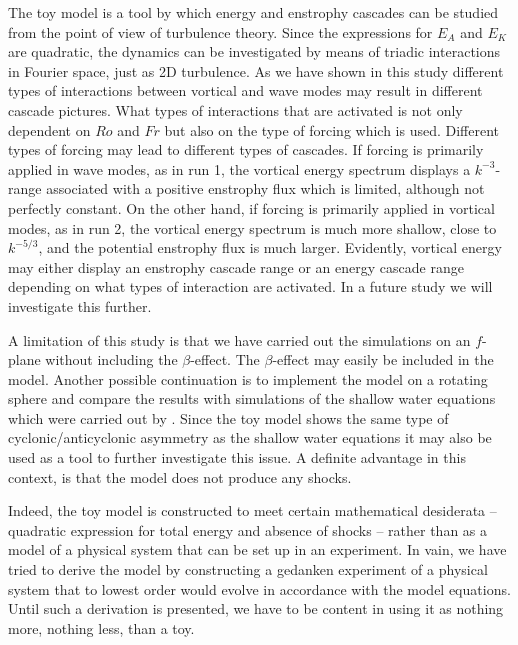 {The toy model is a tool by which energy and enstrophy cascades can be studied from the point of view of turbulence theory. Since the expressions for $ E_A $  and $ E_K $ are quadratic, the dynamics can be investigated by means of triadic interactions in Fourier space, just as 2D turbulence.  As we have shown in this study different types of interactions between vortical and wave modes may result in different cascade pictures. What types of interactions that are activated is not only dependent on $ Ro $ and $ Fr $ but also on the type of forcing which is used. Different types of forcing may lead to different types of cascades. If forcing is primarily applied in  wave modes, as in run 1, the vortical energy spectrum displays a $ k^{-3} $-range associated with a positive enstrophy flux which is limited, although not perfectly constant.  On the other hand, if forcing is primarily applied in vortical modes, as in run 2, the vortical energy spectrum is much more shallow, close to $ k^{-5/3} $, and the potential enstrophy flux is much larger. Evidently, vortical energy may either display an enstrophy cascade range or an energy cascade range depending on what types of interaction are activated. In a future study we will investigate this further.
}

A limitation of this study is that we have carried out the simulations on an $ f $-plane without including the $ \beta $-effect. The $ \beta $-effect may easily be included in the model. Another possible continuation is to implement the model on a rotating sphere and compare the results with simulations of the shallow water equations which were carried out by \citet{Cho1996}. Since the toy model shows the same type of cyclonic/anticyclonic asymmetry as the shallow water equations it may also be used as a tool to further investigate this issue. A definite advantage in this context, is that the model does not produce any shocks.

Indeed,  the toy model is constructed to meet certain mathematical desiderata -- quadratic expression for total energy and absence of shocks -- rather than as a model of a physical system that can be set up in an experiment.  In vain, we have tried to derive the model by constructing a gedanken experiment of a physical system that  to lowest order would evolve in accordance with the model equations. Until such a derivation is presented, we have to be content in using it as nothing more, nothing less,  than a toy.



